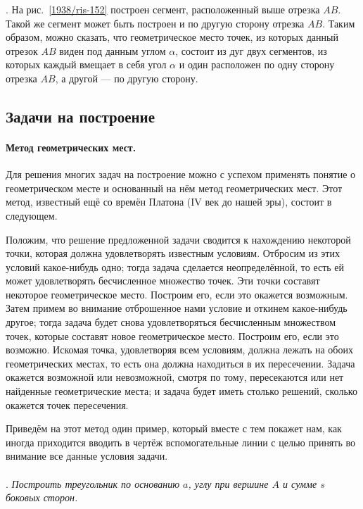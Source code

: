\documentclass[oneside]{book}
\begin{document}
\smallskip
\mbox{.}
На рис.~\ref{1938/ris-152} построен сегмент, расположенный выше отрезка $AB$.
Такой же сегмент может быть построен и по другую сторону отрезка $AB$.
Таким образом, можно сказать, что геометрическое место точек, из которых данный отрезок $AB$ виден под данным углом $\alpha$, состоит из дуг двух сегментов, из которых каждый вмещает в себя угол $\alpha$ и один расположен по одну сторону отрезка $AB$, а другой — по другую сторону.

\subsection*{Задачи на построение}

\paragraph{Метод геометрических мест.}\label{1938/133}
Для решения многих задач на построение можно с успехом применять понятие о геометрическом месте и основанный на нём метод геометрических мест.
Этот метод, известный ещё со времён Платона (IV век до нашей эры), состоит в следующем.

Положим, что решение предложенной задачи сводится к нахождению некоторой точки, которая должна удовлетворять известным условиям.
Отбросим из этих условий какое-нибудь одно;
тогда задача сделается неопределённой, то есть ей может удовлетворять бесчисленное множество точек.
Эти точки составят некоторое геометрическое место.
Построим его, если это окажется возможным.
Затем примем во внимание отброшенное нами условие и откинем какое-нибудь другое;
тогда задача будет снова удовлетворяться бесчисленным множеством точек, которые составят новое геометрическое место.
Построим его, если это возможно.
Искомая точка, удовлетворяя всем условиям, должна лежать на обоих геометрических местах, то есть она должна находиться в их пересечении.
Задача окажется возможной или невозможной, смотря по тому, пересекаются или нет найденные геометрические места;
и задача будет иметь столько решений, сколько окажется точек пересечения.

Приведём на этот метод один пример, который вместе с тем покажет нам, как иногда приходится вводить в чертёж вспомогательные линии с целью принять во внимание все данные условия задачи.

\paragraph{}\label{1938/134}
.
\emph{Построить треугольник по основанию $a$, углу при вершине $A$ и сумме $s$ боковых сторон.}
\end{document}

